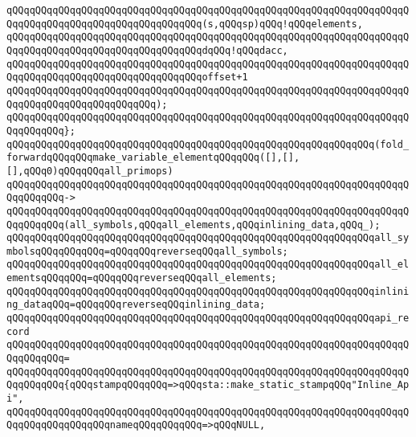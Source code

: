 \verb|qQQqqQQqqQQqqQQqqQQqqQQqqQQqqQQqqQQqqQQqqQQqqQQqqQQqqQQqqQQqqQQqqQQqqQQqqQQqqQQqqQQqqQQqqQQqqQQqqQQqqQQq(s,qQQqsp)qQQq!qQQqelements,|\newline
\verb|qQQqqQQqqQQqqQQqqQQqqQQqqQQqqQQqqQQqqQQqqQQqqQQqqQQqqQQqqQQqqQQqqQQqqQQqqQQqqQQqqQQqqQQqqQQqqQQqqQQqqQQqdqQQq!qQQqdacc,|\newline
\verb|qQQqqQQqqQQqqQQqqQQqqQQqqQQqqQQqqQQqqQQqqQQqqQQqqQQqqQQqqQQqqQQqqQQqqQQqqQQqqQQqqQQqqQQqqQQqqQQqqQQqqQQqoffset+1|\newline
\verb|qQQqqQQqqQQqqQQqqQQqqQQqqQQqqQQqqQQqqQQqqQQqqQQqqQQqqQQqqQQqqQQqqQQqqQQqqQQqqQQqqQQqqQQqqQQqqQQq);|\newline
\verb|qQQqqQQqqQQqqQQqqQQqqQQqqQQqqQQqqQQqqQQqqQQqqQQqqQQqqQQqqQQqqQQqqQQqqQQqqQQqqQQq};|\newline
\newline
\verb|qQQqqQQqqQQqqQQqqQQqqQQqqQQqqQQqqQQqqQQqqQQqqQQqqQQqqQQqqQQqqQQq(fold_forwardqQQqqQQqmake_variable_elementqQQqqQQq([],[],[],qQQq0)qQQqqQQqall_primops)|\newline
\verb|qQQqqQQqqQQqqQQqqQQqqQQqqQQqqQQqqQQqqQQqqQQqqQQqqQQqqQQqqQQqqQQqqQQqqQQqqQQqqQQq->|\newline
\verb|qQQqqQQqqQQqqQQqqQQqqQQqqQQqqQQqqQQqqQQqqQQqqQQqqQQqqQQqqQQqqQQqqQQqqQQqqQQqqQQq(all_symbols,qQQqall_elements,qQQqinlining_data,qQQq_);|\newline
\newline
\newline
\verb|qQQqqQQqqQQqqQQqqQQqqQQqqQQqqQQqqQQqqQQqqQQqqQQqqQQqqQQqqQQqqQQqall_symbolsqQQqqQQqqQQq=qQQqqQQqreverseqQQqall_symbols;|\newline
\verb|qQQqqQQqqQQqqQQqqQQqqQQqqQQqqQQqqQQqqQQqqQQqqQQqqQQqqQQqqQQqqQQqall_elementsqQQqqQQq=qQQqqQQqreverseqQQqall_elements;|\newline
\verb|qQQqqQQqqQQqqQQqqQQqqQQqqQQqqQQqqQQqqQQqqQQqqQQqqQQqqQQqqQQqqQQqinlining_dataqQQq=qQQqqQQqreverseqQQqinlining_data;|\newline
\newline
\verb|qQQqqQQqqQQqqQQqqQQqqQQqqQQqqQQqqQQqqQQqqQQqqQQqqQQqqQQqqQQqqQQqapi_record|\newline
\verb|qQQqqQQqqQQqqQQqqQQqqQQqqQQqqQQqqQQqqQQqqQQqqQQqqQQqqQQqqQQqqQQqqQQqqQQqqQQqqQQq=|\newline
\verb|qQQqqQQqqQQqqQQqqQQqqQQqqQQqqQQqqQQqqQQqqQQqqQQqqQQqqQQqqQQqqQQqqQQqqQQqqQQqqQQq{qQQqstampqQQqqQQq=>qQQqsta::make_static_stampqQQq"Inline_Api",|\newline
\verb|qQQqqQQqqQQqqQQqqQQqqQQqqQQqqQQqqQQqqQQqqQQqqQQqqQQqqQQqqQQqqQQqqQQqqQQqqQQqqQQqqQQqqQQqnameqQQqqQQqqQQq=>qQQqNULL,|\newline
